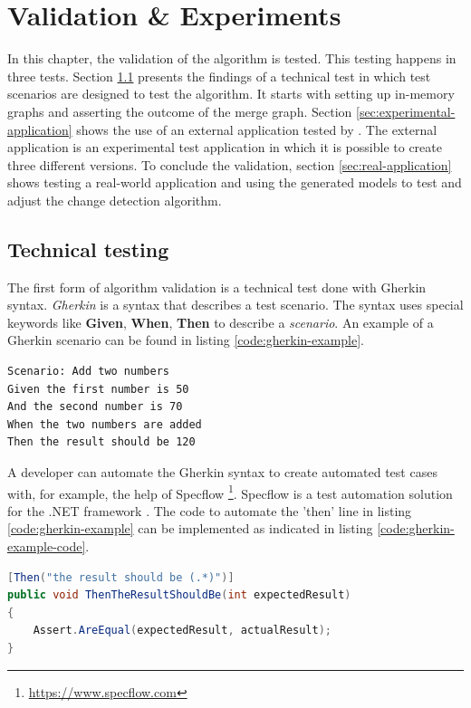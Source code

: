 \chapter{Validation \& Experiments} \label{chapter:validation-experiments}

In this chapter, the validation of the algorithm is tested. This testing happens in three tests. Section \ref{sec:scenarios-testing} presents the findings of a technical test in which test scenarios are designed to test the algorithm. It starts with setting up in-memory graphs and asserting the outcome of the merge graph. Section \ref{sec:experimental-application} shows the use of an external application tested by \testar. The external application is an experimental test application in which it is possible to create three different versions. To conclude the validation, section \ref{sec:real-application} shows testing a real-world application and using the generated models to test and adjust the change detection algorithm. 

\section{Technical testing} \label{sec:scenarios-testing}
The first form of algorithm validation is a technical test done with Gherkin syntax. \textit{Gherkin} is a syntax that describes a test scenario. The syntax uses special keywords like \textbf{Given}, \textbf{When}, \textbf{Then} to describe a \textit{scenario}. An example of a Gherkin scenario can be found in listing \ref{code:gherkin-example}.

\begin{lstlisting}[language=Gherkin, caption=Calculator test example, label=code:gherkin-example]
Scenario: Add two numbers
Given the first number is 50
And the second number is 70
When the two numbers are added
Then the result should be 120
\end{lstlisting}

A developer can automate the Gherkin syntax to create automated test cases with, for example, the help of Specflow \footnote{\url{https://www.specflow.com}}. Specflow is a test automation solution for the .NET framework \cite{specflow}. The code to automate the 'then' line in listing \ref{code:gherkin-example} can be implemented as indicated in listing \ref{code:gherkin-example-code}.

\begin{lstlisting}[language=Java, caption=Implementation of a 'then' line, label=code:gherkin-example-code]
[Then("the result should be (.*)")]
public void ThenTheResultShouldBe(int expectedResult)
{
    Assert.AreEqual(expectedResult, actualResult);
}
\end{lstlisting}

